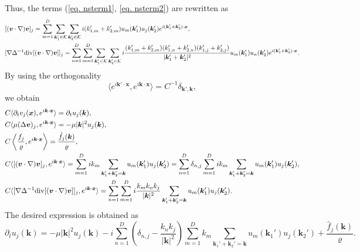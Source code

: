 \documentclass[a4paper,11pt,fleqn]{article}
\begin{document}
Thus, the terms (\ref{eq. nsterm1}, \ref{eq. nsterm2}) are rewritten as 
\begin{align}
    &[({\bm v}\cdot \nabla){\bm v}]_j =  \sum_{m=1}^D\sum_{{\bm k}_1'\in \mathcal{K}}\sum_{{\bm k}_2'\in \mathcal{K}} i(k_{1,m}'+k_{2,m}') u_m({\bm k}_1')u_j({\bm k}_2')e^{i({\bm k}_1'+{\bm k}_2')\cdot{\bm x}}, \\
    &[\nabla \Delta^{-1}{\rm div}[({\bm v}\cdot \nabla){\bm v}]]_j = \sum_{n=1}^D\sum_{m=1}^D\sum_{{\bm k}_1'\in \mathcal{K}}\sum_{{\bm k}_2'\in \mathcal{K}} i\frac{(k_{1,m}'+k_{2,m}')(k_{1,n}'+k_{2,n}')(k_{1,j}'+k_{2,j}')}{|{\bm k}_1' + {\bm k}_2'|^2} u_m({\bm k}_1')u_n({\bm k}_2')e^{i({\bm k}_1'+{\bm k}_2')\cdot{\bm x}}.
\end{align}
By using the orthogonality
\begin{equation}
    \langle e^{i{\bm k}'\cdot{\bm x}},e^{i{\bm k}\cdot{\bm x}}  \rangle = C^{-1} \delta_{{\bm k}',{\bm k}}, 
\end{equation}
we obtain 
\begin{align}
    &C\langle \partial_t v_j({\bm x}), e^{i{\bm k}\cdot{\bm x}}  \rangle  = \partial_tu_j({\bm k}), \\
    &C\langle \mu (\Delta {\bm v})_j, e^{i{\bm k}\cdot{\bm x}}  \rangle  =-\mu|{\bm k}|^2 u_j({\bm k}), \\
    &C\left\langle \frac{f_j}{\varrho}, e^{i{\bm k}\cdot{\bm x}}  \right\rangle  =\frac{\hat{f}_j({\bm k})}{\varrho}, \\
    &C\langle [({\bm v}\cdot \nabla){\bm v}]_j, e^{i{\bm k}\cdot{\bm x}}  \rangle  = \sum_{m=1}^D ik_m\sum_{{\bm k}_1'+{\bm k}_2' = {\bm k}}u_m({\bm k}_1')u_j({\bm k}_2') = \sum_{n=1}^D \delta_{n,j} \sum_{m=1}^D ik_m\sum_{{\bm k}_1'+{\bm k}_2' = {\bm k}}u_m({\bm k}_1')u_j({\bm k}_2'),\\
    &C\langle [\nabla \Delta^{-1}{\rm div}[({\bm v}\cdot \nabla){\bm v}]]_j, e^{i{\bm k}\cdot{\bm x}}  
    \rangle = \sum_{n=1}^D\sum_{m=1}^D i\frac{k_m k_n k_j}{|{\bm k}|^2}  \sum_{{\bm k}_1'+{\bm k}_2' = {\bm k}}u_m({\bm k}_1')u_j({\bm k}_2').
\end{align}
The desired expression is obtained as 
\begin{equation}
    \partial_tu_j({\bm k}) = -\mu|{\bm k}|^2 u_j({\bm k}) - i\sum_{n=1}^D \left(\delta_{n,j} - \frac{k_n k_j}{|{\bm k}|^2} \right) \sum_{m=1}^D k_m\sum_{{\bm k}_1'+{\bm k}_2' = {\bm k}}u_m({\bm k}_1')u_j({\bm k}_2')+\frac{\hat{f}_j({\bm k})}{\varrho}.
\end{equation}
\end{document}
